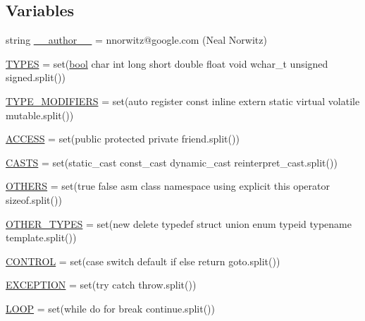 \subsection*{Variables}
\begin{DoxyCompactItemize}
\item 
string \hyperlink{namespacecpp_1_1keywords_a9fc334775aca87951ebdcd556dac21cc}{\+\_\+\+\_\+author\+\_\+\+\_\+} = \textquotesingle{}nnorwitz@google.\+com (Neal Norwitz)\textquotesingle{}
\item 
\hyperlink{namespacecpp_1_1keywords_a56fd5baf357970548e1ec366edfc2c13}{T\+Y\+P\+ES} = set(\textquotesingle{}\hyperlink{classbool}{bool} char int long short double float void wchar\+\_\+t unsigned signed\textquotesingle{}.split())
\item 
\hyperlink{namespacecpp_1_1keywords_af9282ce418d6b4b43dca5ed574caedd7}{T\+Y\+P\+E\+\_\+\+M\+O\+D\+I\+F\+I\+E\+RS} = set(\textquotesingle{}auto register const inline extern static virtual volatile mutable\textquotesingle{}.split())
\item 
\hyperlink{namespacecpp_1_1keywords_a786f41bbea982641425c819d10bb2064}{A\+C\+C\+E\+SS} = set(\textquotesingle{}public protected private friend\textquotesingle{}.split())
\item 
\hyperlink{namespacecpp_1_1keywords_aeba38dc38e188040f4ec44ba05092e7f}{C\+A\+S\+TS} = set(\textquotesingle{}static\+\_\+cast const\+\_\+cast dynamic\+\_\+cast reinterpret\+\_\+cast\textquotesingle{}.split())
\item 
\hyperlink{namespacecpp_1_1keywords_a15fe231fbad145538b73892804898809}{O\+T\+H\+E\+RS} = set(\textquotesingle{}true false asm class namespace using explicit this operator sizeof\textquotesingle{}.split())
\item 
\hyperlink{namespacecpp_1_1keywords_aa86a5e35a3ace14022a5ca1b91baf207}{O\+T\+H\+E\+R\+\_\+\+T\+Y\+P\+ES} = set(\textquotesingle{}new delete typedef struct union enum typeid typename template\textquotesingle{}.split())
\item 
\hyperlink{namespacecpp_1_1keywords_a374dfe9c96681079802ba4724287b8ff}{C\+O\+N\+T\+R\+OL} = set(\textquotesingle{}case switch default if else return goto\textquotesingle{}.split())
\item 
\hyperlink{namespacecpp_1_1keywords_a2665fb8a25a4dae03fa5d3dc975c537c}{E\+X\+C\+E\+P\+T\+I\+ON} = set(\textquotesingle{}try catch throw\textquotesingle{}.split())
\item 
\hyperlink{namespacecpp_1_1keywords_af0164c05398a2291487b76414102d555}{L\+O\+OP} = set(\textquotesingle{}while do for break continue\textquotesingle{}.split())

\end{DoxyCompactItemize}
